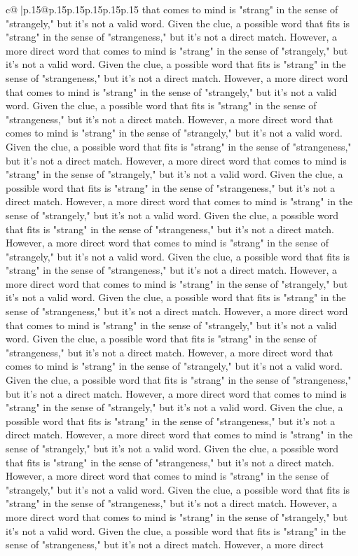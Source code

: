 \documentclass{article}
\begin{document}
{\begin{supertabular}{c@{$\;$}|p{.15\linewidth}@{}p{.15\linewidth}p{.15\linewidth}p{.15\linewidth}p{.15\linewidth}p{.15\linewidth}}
{{{that comes to mind is "strang" in the sense of "strangely," but it's not a valid word. Given the clue, a possible word that fits is "strang" in the sense of "strangeness," but it's not a direct match. However, a more direct word that comes to mind is "strang" in the sense of "strangely," but it's not a valid word. Given the clue, a possible word that fits is "strang" in the sense of "strangeness," but it's not a direct match. However, a more direct word that comes to mind is "strang" in the sense of "strangely," but it's not a valid word. Given the clue, a possible word that fits is "strang" in the sense of "strangeness," but it's not a direct match. However, a more direct word that comes to mind is "strang" in the sense of "strangely," but it's not a valid word. Given the clue, a possible word that fits is "strang" in the sense of "strangeness," but it's not a direct match. However, a more direct word that comes to mind is "strang" in the sense of "strangely," but it's not a valid word. Given the clue, a possible word that fits is "strang" in the sense of "strangeness," but it's not a direct match. However, a more direct word that comes to mind is "strang" in the sense of "strangely," but it's not a valid word. Given the clue, a possible word that fits is "strang" in the sense of "strangeness," but it's not a direct match. However, a more direct word that comes to mind is "strang" in the sense of "strangely," but it's not a valid word. Given the clue, a possible word that fits is "strang" in the sense of "strangeness," but it's not a direct match. However, a more direct word that comes to mind is "strang" in the sense of "strangely," but it's not a valid word. Given the clue, a possible word that fits is "strang" in the sense of "strangeness," but it's not a direct match. However, a more direct word that comes to mind is "strang" in the sense of "strangely," but it's not a valid word. Given the clue, a possible word that fits is "strang" in the sense of "strangeness," but it's not a direct match. However, a more direct word that comes to mind is "strang" in the sense of "strangely," but it's not a valid word. Given the clue, a possible word that fits is "strang" in the sense of "strangeness," but it's not a direct match. However, a more direct word that comes to mind is "strang" in the sense of "strangely," but it's not a valid word. Given the clue, a possible word that fits is "strang" in the sense of "strangeness," but it's not a direct match. However, a more direct word that comes to mind is "strang" in the sense of "strangely," but it's not a valid word. Given the clue, a possible word that fits is "strang" in the sense of "strangeness," but it's not a direct match. However, a more direct word that comes to mind is "strang" in the sense of "strangely," but it's not a valid word. Given the clue, a possible word that fits is "strang" in the sense of "strangeness," but it's not a direct match. However, a more direct word that comes to mind is "strang" in the sense of "strangely," but it's not a valid word. Given the clue, a possible word that fits is "strang" in the sense of "strangeness," but it's not a direct match. However, a more direct }}}
\end{supertabular}}
\end{document}
